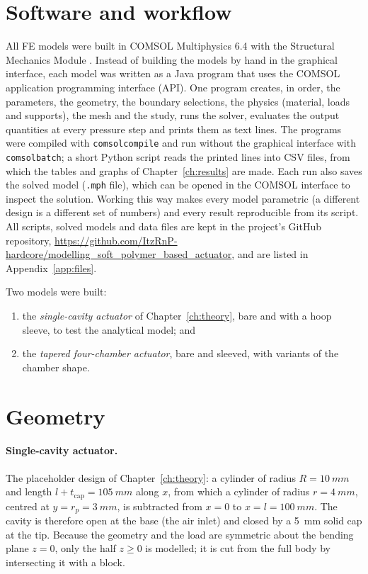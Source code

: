 \documentclass[12pt,a4paper,oneside]{report}
\numberwithin{equation}{chapter}
\numberwithin{figure}{chapter}
\numberwithin{table}{chapter}
\newcommand{\rp}{r_p}
\begin{document}
\section{Software and workflow}\label{sec:comsol}
All FE models were built in COMSOL Multiphysics 6.4 with the Structural Mechanics Module
\cite{comsol,comsolsm}. Instead of building the models by hand in the graphical interface, each model was
written as a Java program that uses the COMSOL application programming interface (API). One program
creates, in order, the parameters, the geometry, the boundary selections, the physics (material, loads and
supports), the mesh and the study, runs the solver, evaluates the output quantities at every pressure step
and prints them as text lines. The programs were compiled with \texttt{comsolcompile} and run without the
graphical interface with \texttt{comsolbatch}; a short Python script reads the printed lines into CSV files,
from which the tables and graphs of Chapter~\ref{ch:results} are made. Each run also saves the solved model
(\texttt{.mph} file), which can be opened in the COMSOL interface to inspect the solution. Working this way
makes every model parametric (a different design is a different set of numbers) and every result
reproducible from its script. All scripts, solved models and data files are kept in the project's GitHub
repository, \url{https://github.com/ItzRnP-hardcore/modelling_soft_polymer_based_actuator}, and are listed in
Appendix~\ref{app:files}.

Two models were built:
\begin{enumerate}
\item the \emph{single-cavity actuator} of Chapter~\ref{ch:theory}, bare and with a hoop sleeve, to test the
analytical model; and
\item the \emph{tapered four-chamber actuator}, bare and sleeved, with variants of the chamber shape.
\end{enumerate}

\section{Geometry}
\paragraph{Single-cavity actuator.} The placeholder design of Chapter~\ref{ch:theory}: a cylinder of radius
$R=\SI{10}{mm}$ and length $l+t_{\text{cap}}=\SI{105}{mm}$ along $x$, from which a cylinder of radius
$r=\SI{4}{mm}$, centred at $y=\rp=\SI{3}{mm}$, is subtracted from $x=0$ to $x=l=\SI{100}{mm}$. The cavity is
therefore open at the base (the air inlet) and closed by a \SI{5}{mm} solid cap at the tip. Because the
geometry and the load are symmetric about the bending plane $z=0$, only the half $z\ge0$ is modelled; it is
cut from the full body by intersecting it with a block.
\end{document}

